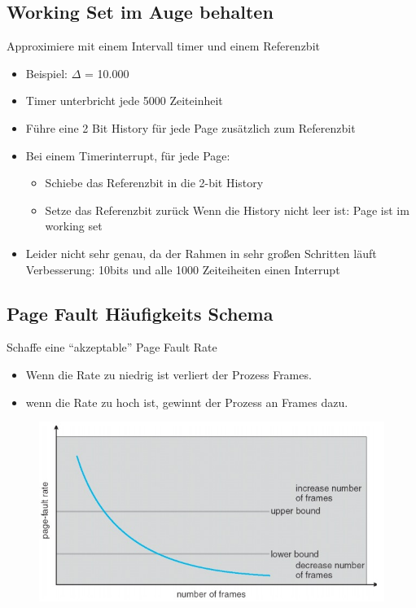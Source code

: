 \documentclass[a4paper]{scrreprt}
\begin{document}
\subsection{Working Set im Auge behalten}
Approximiere mit einem Intervall timer und einem Referenzbit
\begin{itemize}
\item Beispiel: $\Delta$ = 10.000
\item Timer unterbricht jede 5000 Zeiteinheit
\item Führe eine 2 Bit History für jede Page zusätzlich zum Referenzbit
\item Bei einem Timerinterrupt, für jede Page:
\begin{itemize}
\item Schiebe das Referenzbit in die 2-bit History
\item Setze das Referenzbit zurück
\subitem Wenn die History nicht leer ist: Page ist im working set
\end{itemize}
\item Leider nicht sehr genau, da der Rahmen in sehr großen Schritten läuft
\subitem Verbesserung: 10bits und alle 1000 Zeiteiheiten einen Interrupt
\end{itemize}

\subsection{Page Fault Häufigkeits Schema}
Schaffe eine "`akzeptable"' Page Fault Rate
\begin{itemize}
\item Wenn die Rate zu niedrig ist verliert der Prozess Frames.
\item wenn die Rate zu hoch ist, gewinnt der Prozess an Frames dazu.
\end{itemize}

\begin{figure}[ht]
\centering
\includegraphics[scale=0.5]{graphics/pagefaultfrequency.png}
\end{figure}
\end{document}

